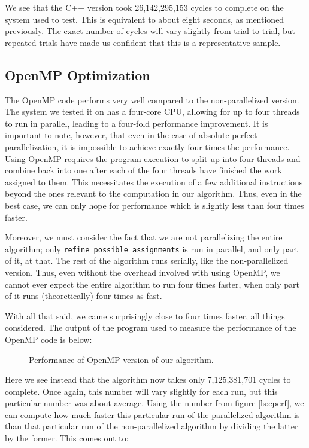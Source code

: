 \documentclass{article}
\begin{document}
  We see that the C++ version took 26,142,295,153 cycles to complete on the system used to test. This is equivalent to about eight seconds, as mentioned previously. The exact number of cycles will vary slightly from trial to trial, but repeated trials have made us confident that this is a representative sample.

  \subsection{OpenMP Optimization}
  The OpenMP code performs very well compared to the non-parallelized version. The system we tested it on has a four-core CPU, allowing for up to four threads to run in parallel, leading to a four-fold performance improvement. It is important to note, however, that even in the case of absolute perfect parallelization, it is impossible to achieve exactly four times the performance. Using OpenMP requires the program execution to split up into four threads and combine back into one after each of the four threads have finished the work assigned to them. This necessitates the execution of a few additional instructions beyond the ones relevant to the computation in our algorithm. Thus, even in the best case, we can only hope for performance which is slightly less than four times faster.

  Moreover, we must consider the fact that we are not parallelizing the entire algorithm; only \texttt{refine\_possible\_assignments} is run in parallel, and only part of it, at that. The rest of the algorithm runs serially, like the non-parallelized version. Thus, even without the overhead involved with using OpenMP, we cannot ever expect the entire algorithm to run four times faster, when only part of it runs (theoretically) four times as fast. 

  With all that said, we came surprisingly close to four times faster, all things considered. The output of the program used to measure the performance of the OpenMP code is below:

  \setcounter{figure}{0}
  \begin{figure}[H]
    \centering
    
    \caption{Performance of OpenMP version of our algorithm.}
    \label{ls:ompperf}
  \end{figure}

  Here we see instead that the algorithm now takes only 7,125,381,701 cycles to complete. Once again, this number will vary slightly for each run, but this particular number was about average. Using the number from figure \ref{ls:cperf}, we can compute how much faster this particular run of the parallelized algorithm is than that particular run of the non-parallelized algorithm by dividing the latter by the former. This comes out to:
\end{document}
